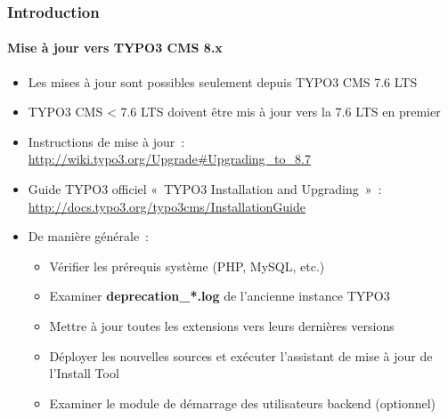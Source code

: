 \begin{frame}[fragile]
	\frametitle{Introduction}
	\framesubtitle{Mise à jour vers TYPO3 CMS 8.x}

	\begin{itemize}
		\item Les mises à jour sont possibles seulement depuis TYPO3 CMS 7.6 LTS
		\item TYPO3 CMS < 7.6 LTS doivent être mis à jour vers la 7.6 LTS en premier
	\end{itemize}

	\begin{itemize}

		\item Instructions de mise à jour~:\newline
			\smaller\url{http://wiki.typo3.org/Upgrade#Upgrading_to_8.7}\normalsize
		\item Guide TYPO3 officiel «~TYPO3 Installation and Upgrading~»~:
			\smaller\url{http://docs.typo3.org/typo3cms/InstallationGuide}\normalsize
		\item De manière générale~:
			\begin{itemize}
				\item Vérifier les prérequis système \small(PHP, MySQL, etc.)
				\item Examiner \textbf{deprecation\_*.log} de l'ancienne instance TYPO3
				\item Mettre à jour toutes les extensions vers leurs dernières versions
				\item Déployer les nouvelles sources et exécuter l'assistant de mise à jour de l'Install Tool
				\item Examiner le module de démarrage des utilisateurs backend (optionnel)
			\end{itemize}
	\end{itemize}

\end{frame}


